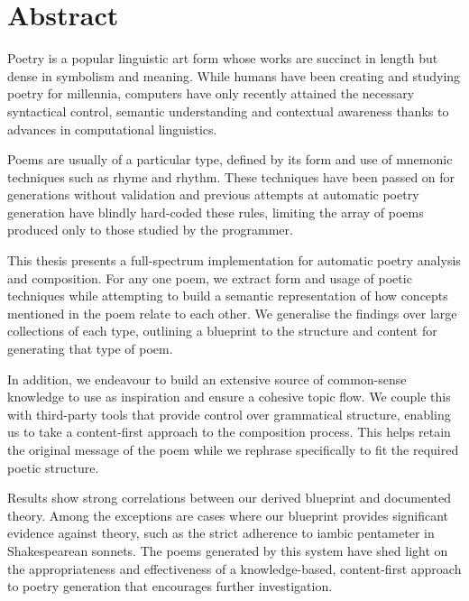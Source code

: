 \chapter{Abstract}
\ifpdf
    \graphicspath{{Abstract/AbstractFigs/PNG/}{Abstract/AbstractFigs/PDF/}{Abstract/AbstractFigs/}}
\else
    \graphicspath{{Abstract/AbstractFigs/EPS/}{Abstract/AbstractFigs/}}
\fi

Poetry is a popular linguistic art form whose works are succinct in length but dense in symbolism and meaning. While humans have been creating and studying poetry for millennia, computers have only recently attained the necessary syntactical control, semantic understanding and contextual awareness thanks to advances in computational linguistics. 

Poems are usually of a particular type, defined by its form and use of mnemonic techniques such as rhyme and rhythm. These techniques have been passed on for generations without validation and previous attempts at automatic poetry generation have blindly hard-coded these rules, limiting the array of poems produced only to those studied by the programmer.

This thesis presents a full-spectrum implementation for automatic poetry analysis and composition. For any one poem, we extract form and usage of poetic techniques while attempting to build a semantic representation of how concepts mentioned in the poem relate to each other. We generalise the findings over large collections of each type, outlining a blueprint to the structure and content for generating that type of poem.

In addition, we endeavour to build an extensive source of common-sense knowledge to use as inspiration and ensure a cohesive topic flow. We couple this with third-party tools that provide control over grammatical structure, enabling us to take a content-first approach to the composition process. This helps retain the original message of the poem while we rephrase specifically to fit the required poetic structure.

Results show strong correlations between our derived blueprint and documented theory. Among the exceptions are cases where our blueprint provides significant evidence against theory, such as the strict adherence to iambic pentameter in Shakespearean sonnets. The poems generated by this system have shed light on the appropriateness and effectiveness of a knowledge-based, content-first approach to poetry generation that encourages further investigation. 



